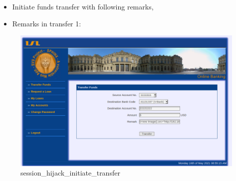 \begin{itemize}
\item
  Initiate funds transfer with following remarks,
\item
  Remarks in transfer 1:
\end{itemize}

\begin{Shaded}
\begin{Highlighting}[]
\OperatorTok{\textless{}}\OperatorTok{\textgreater{}} \NormalTok{()}\OperatorTok{=}\OperatorTok{+}\OperatorTok{;\textless{}/}\OperatorTok{\textgreater{}}
\end{Highlighting}
\end{Shaded}

\begin{figure}
\centering
\includegraphics{images/task2/session_hijack_initiate_transfer.PNG}
\caption{session\_hijack\_initiate\_transfer}
\end{figure}

